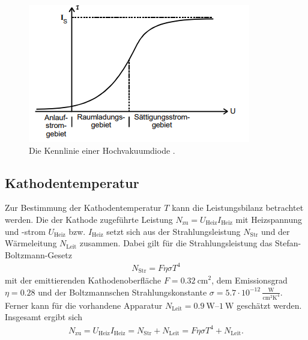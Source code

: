 \begin{figure}[H]
    \centering
    \includegraphics[height = 5 cm]{Abbildungen/kennlinie.png}
    \caption{Die Kennlinie einer Hochvakuumdiode \cite[]{man:v504}.}
    \label{fig:kennlinie}
\end{figure}






\subsection{Kathodentemperatur}
\label{sec:teo_temp}
Zur Bestimmung der Kathodentemperatur $T$ kann die Leistungsbilanz betrachtet werden.
Die der Kathode zugeführte Leistung $N_\text{zu} = U_\text{Heiz} I_\text{Heiz}$ mit Heizspannung und -strom $U_\text{Heiz}$ bzw. 
$I_\text{Heiz}$ setzt sich aus der Strahlungsleistung $N_\text{Str}$ und der Wärmeleitung $N_\text{Leit}$ zusammen.
Dabei gilt für die Strahlungsleistung das Stefan-Boltzmann-Gesetz
\begin{align}
    N_\text{Str} = F \eta \sigma T^4
\end{align}
mit der emittierenden Kathodenoberfläche $F = \qty{0.32}{\cm}^2$, dem Emissionsgrad $\eta = \num{0.28}$ und der 
Boltzmannschen Strahlungskonstante $\sigma = \num[]{5.7} \cdot 10^{-12} \, \frac{\unit{\watt}}{\unit{\cm}^2\unit{\kelvin}^4}$.
Ferner kann für die vorhandene Apparatur $N_\text{Leit} = \qtyrange{0.9}{1}{\watt}$ geschätzt werden.
Insgesamt ergibt sich 
\begin{align}
    N_\text{zu} = U_\text{Heiz} I_\text{Heiz} = N_\text{Str} + N_\text{Leit} = F \eta \sigma T^4 + N_\text{Leit}.
    \label{eq:leistung}
\end{align}


